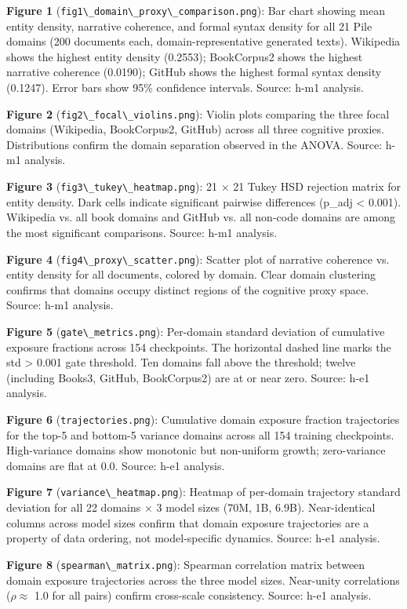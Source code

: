 
\textbf{Figure 1} (\texttt{fig1\textbackslash \_domain\textbackslash \_proxy\textbackslash \_comparison.png}): Bar chart showing mean entity density, narrative coherence, and formal syntax density for all 21 Pile domains (200 documents each, domain-representative generated texts). Wikipedia shows the highest entity density (0.2553); BookCorpus2 shows the highest narrative coherence (0.0190); GitHub shows the highest formal syntax density (0.1247). Error bars show 95\% confidence intervals. Source: h-m1 analysis.

\textbf{Figure 2} (\texttt{fig2\textbackslash \_focal\textbackslash \_violins.png}): Violin plots comparing the three focal domains (Wikipedia, BookCorpus2, GitHub) across all three cognitive proxies. Distributions confirm the domain separation observed in the ANOVA. Source: h-m1 analysis.

\textbf{Figure 3} (\texttt{fig3\textbackslash \_tukey\textbackslash \_heatmap.png}): 21 $\times$ 21 Tukey HSD rejection matrix for entity density. Dark cells indicate significant pairwise differences (p\_adj < 0.001). Wikipedia vs. all book domains and GitHub vs. all non-code domains are among the most significant comparisons. Source: h-m1 analysis.

\textbf{Figure 4} (\texttt{fig4\textbackslash \_proxy\textbackslash \_scatter.png}): Scatter plot of narrative coherence vs. entity density for all documents, colored by domain. Clear domain clustering confirms that domains occupy distinct regions of the cognitive proxy space. Source: h-m1 analysis.

\textbf{Figure 5} (\texttt{gate\textbackslash \_metrics.png}): Per-domain standard deviation of cumulative exposure fractions across 154 checkpoints. The horizontal dashed line marks the std > 0.001 gate threshold. Ten domains fall above the threshold; twelve (including Books3, GitHub, BookCorpus2) are at or near zero. Source: h-e1 analysis.

\textbf{Figure 6} (\texttt{trajectories.png}): Cumulative domain exposure fraction trajectories for the top-5 and bottom-5 variance domains across all 154 training checkpoints. High-variance domains show monotonic but non-uniform growth; zero-variance domains are flat at 0.0. Source: h-e1 analysis.

\textbf{Figure 7} (\texttt{variance\textbackslash \_heatmap.png}): Heatmap of per-domain trajectory standard deviation for all 22 domains $\times$ 3 model sizes (70M, 1B, 6.9B). Near-identical columns across model sizes confirm that domain exposure trajectories are a property of data ordering, not model-specific dynamics. Source: h-e1 analysis.

\textbf{Figure 8} (\texttt{spearman\textbackslash \_matrix.png}): Spearman correlation matrix between domain exposure trajectories across the three model sizes. Near-unity correlations ($\rho \approx$ 1.0 for all pairs) confirm cross-scale consistency. Source: h-e1 analysis.
